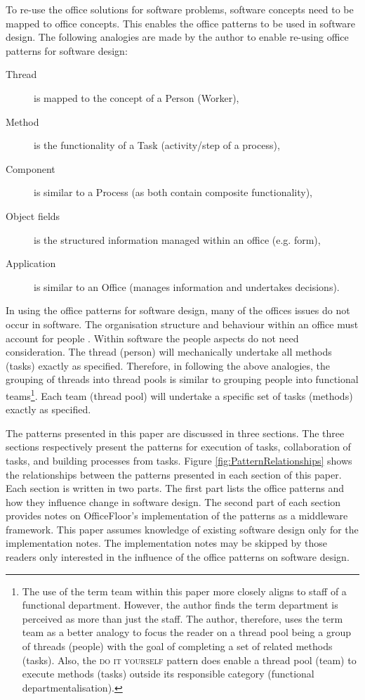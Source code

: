 \documentclass[prodmode]{style/acmlarge}
\begin{document}
To re-use the office solutions for software problems, software concepts need to
be mapped to office concepts.  This enables the office patterns to be used in
software design.  The following analogies are made by the author to enable
re-using office patterns for software design:
\begin{description}
  \item[Thread] is mapped to the concept of a Person (Worker),
  \item[Method] is the functionality of a Task (activity/step of a process),
  \item[Component] is similar to a Process (as both contain composite functionality),
  \item[Object fields] is the structured information managed within an office (e.g. form),
  \item[Application] is similar to an Office (manages information and undertakes decisions).
\end{description}

In using the office patterns for software design, many of the offices issues do
not occur in software.  The organisation structure and behaviour within an
office must account for people \cite{organisational-behaviour}.  Within software
the people aspects do not need consideration.  The thread (person) will
mechanically undertake all methods (tasks) exactly as specified.  Therefore, in
following the above analogies, the grouping of threads into thread pools is
similar to grouping people into functional teams\footnote{The use of the term
team within this paper more closely aligns to staff of a functional department.
However, the author finds the term department is perceived as more than just the
staff.  The author, therefore, uses the term team as a better analogy to focus
the reader on a thread pool being a group of threads (people) with the goal of
completing a set of related methods (tasks).  Also, the \textsc{do it yourself}
pattern does enable a thread pool (team) to execute methods (tasks) outside its
responsible category (functional departmentalisation).}.  Each team (thread
pool) will undertake a specific set of tasks (methods) exactly as specified.

The patterns presented in this paper are discussed in three sections.  The three
sections respectively present the patterns for execution of tasks, collaboration
of tasks, and building processes from tasks.  Figure
\ref{fig:PatternRelationships} shows the relationships between the patterns
presented in each section of this paper.  Each section is written in two parts.
The first part lists the office patterns and how they influence change in
software design.  The second part of each section provides notes on
OfficeFloor's implementation of the patterns as a middleware framework.  This
paper assumes knowledge of existing software design only for the implementation
notes.  The implementation notes may be skipped by those readers only interested
in the influence of the office patterns on software design.
\end{document}
